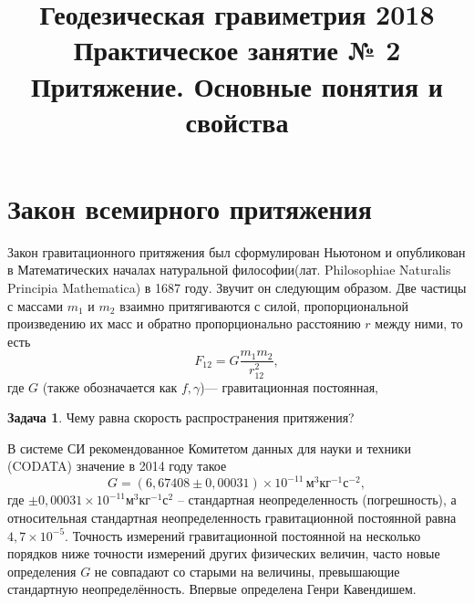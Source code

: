 \documentclass[11pt, a4paper]{article}
\title{{\Large Геодезическая гравиметрия 2018}\\ 
    {\bf\Large Практическое занятие № 2} \\
{\Large Притяжение. Основные понятия и свойства}}
\author{}
\date{\DTMusedate{lessondate}}
\theoremstyle{plain}
\theoremstyle{definition}
\newtheorem{problem}{Задача}[section]
\theoremstyle{remark}
\begin{document}
\maketitle

\section{Закон всемирного притяжения}

Закон гравитационного притяжения был сформулирован Ньютоном и опубликован в Математических началах
натуральной философии\cite{Newton1687}(лат. Philosophiae Naturalis Principia Mathematica) в 1687
году.
Звучит он следующим образом. Две частицы с массами $m_1$ и $m_2$ взаимно притягиваются с силой,
пропорциональной произведению их масс и обратно пропорционально расстоянию $r$ между ними, то есть
\begin{equation*}
    F_{12} = G\dfrac{m_1m_2}{r_{12}^2},
\end{equation*}
где $G$ (также обозначается как $f,\gamma$)--- гравитационная постоянная, 

\begin{problem}
    Чему равна скорость распространения притяжения?
\end{problem}

В системе СИ рекомендованное Комитетом данных для науки и техники (CODATA) значение в 2014
году\cite{CODATA2014} такое
\begin{equation*}
    G = (6,67408 \pm 0,00031)\times10^{-11}\,\text{м}^3\text{кг}^{-1}\text{с}^{-2},
\end{equation*}
где $\pm0,00031\times10^{-11}\text{м}^3\text{кг}^{-1}\text{с}^2$ -- стандартная неопределенность
(погрешность), а относительная стандартная неопределенность гравитационной постоянной
равна $4,7\times10^{-5}$. Точность измерений гравитационной постоянной на несколько порядков ниже
точности измерений других физических величин,  часто новые определения $G$ не совпадают со старыми
на величины, превышающие стандартную неопределённость. Впервые определена Генри Кавендишем.
\end{document}
